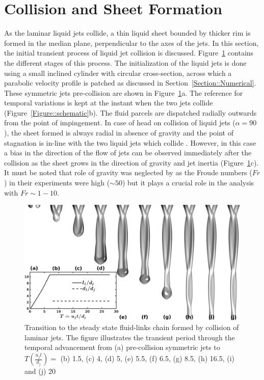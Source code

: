 \documentclass[%
aip,
sd,%
amsmath,amssymb,
preprint,%
author-year,%
]{revtex4-1}
\begin{document}
\section{Collision and Sheet Formation}
As the laminar liquid jets collide, a thin liquid sheet bounded by thicker rim is formed in the median plane, perpendicular to the axes of the jets. In this section, the initial transient process of liquid jet collision is discussed. Figure~\ref{Figure::transient} contains the different stages of this process. The initialization of the liquid jets is done using a small inclined cylinder with circular cross-section, across which a parabolic velocity profile is patched as discussed in Section~\ref{Section::Numerical}. These symmetric jets pre-collision are shown in Figure~\ref{Figure::transient}a. The reference for temporal variations is kept at the instant when the two jets collide (Figure~\ref{Figure::schematic}b). The fluid parcels are dispatched radially outwards from the point of impingement. In case of head on collision of liquid jets ($\alpha = 90$), the sheet formed is always radial in absence of gravity \citep{eggers2008physics} and the point of stagnation is in-line with the two liquid jets which collide \citep{inamura2014effect}. However, in this case a bias in the direction of the flow of jets can be observed immediately after the collision as the sheet grows in the direction of gravity and jet inertia (Figure~\ref{Figure::transient}c). It must be noted that role of gravity was neglected by \cite{bush2004collision,bremond2006atomization} as the Froude numbers ($Fr$) in their experiments were high ($\sim 50$) but it plays a crucial role in the analysis with $Fr \sim 1-10$. \\ 
\begin{figure}
	\centering
	\includegraphics[width=\linewidth]{fig0}
	\caption{Transition to the steady state fluid-links chain formed by collision of laminar jets. The figure illustrates the transient period through the temporal advancement from (a) pre-collision symmetric jets to $T (\frac{u_jt}{d_j}) = $ (b) 1.5, (c) 4, (d) 5, (e) 5.5, (f) 6.5, (g) 8.5, (h) 16.5, (i) and (j) 20}
	\label{Figure::transient}
\end{figure}
\end{document}
